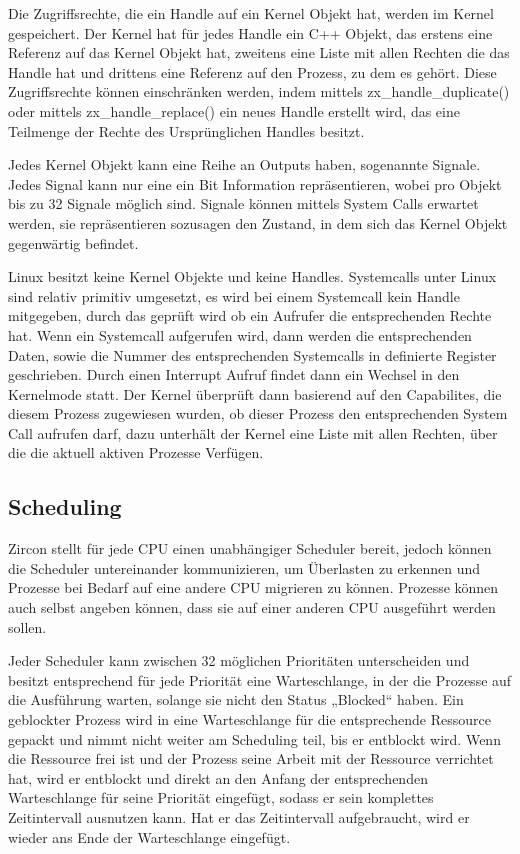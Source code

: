 \documentclass[a4paper]{scrartcl}
\begin{document}
Die Zugriffsrechte, die ein Handle auf ein Kernel Objekt hat, werden im Kernel gespeichert. Der Kernel hat für jedes Handle ein C++ Objekt, das erstens eine Referenz auf das Kernel Objekt hat, zweitens eine Liste mit allen Rechten die das Handle hat und drittens eine Referenz auf den Prozess, zu dem es gehört. Diese Zugriffsrechte können einschränken werden, indem mittels zx\_handle\_duplicate() \cite{Fuchsia.HandleDuplicate} oder mittels zx\_handle\_replace() \cite{Fuchsia.HandleReplace} ein neues Handle erstellt wird, das eine Teilmenge der Rechte des Ursprünglichen Handles besitzt.  \cite{Fuchsia.Zircon.Handles}

Jedes Kernel Objekt kann eine Reihe an Outputs haben, sogenannte Signale. Jedes Signal kann nur eine ein Bit Information repräsentieren, wobei pro Objekt bis zu 32 Signale möglich sind. Signale können mittels System Calls erwartet werden, sie repräsentieren sozusagen den Zustand, in dem sich das Kernel Objekt gegenwärtig befindet. \cite{Fuchsia.Zircon.Signals}

Linux besitzt keine Kernel Objekte und keine Handles. Systemcalls unter Linux sind relativ primitiv umgesetzt, es wird bei einem Systemcall kein Handle mitgegeben, durch das geprüft wird ob ein Aufrufer die entsprechenden Rechte hat. Wenn ein Systemcall aufgerufen wird, dann werden die entsprechenden Daten, sowie die Nummer des entsprechenden Systemcalls in definierte Register geschrieben. Durch einen Interrupt Aufruf findet dann ein Wechsel in den Kernelmode statt. Der Kernel überprüft dann basierend auf den Capabilites, die diesem Prozess zugewiesen wurden, ob dieser Prozess den entsprechenden System Call aufrufen darf, dazu unterhält der Kernel eine Liste mit allen Rechten, über die die aktuell aktiven Prozesse Verfügen. \cite{Android.Kernel.Capabilities}
\subsection{Scheduling}
Zircon stellt für jede CPU einen unabhängiger Scheduler bereit, jedoch können die Scheduler untereinander kommunizieren, um Überlasten zu erkennen und Prozesse bei Bedarf auf eine andere CPU migrieren zu können. Prozesse können auch selbst angeben können, dass sie auf einer anderen CPU ausgeführt werden sollen.

Jeder Scheduler kann zwischen 32 möglichen Prioritäten unterscheiden und besitzt entsprechend für jede Priorität eine Warteschlange, in der die Prozesse auf die Ausführung warten, solange sie nicht den Status „Blocked“ haben. Ein geblockter Prozess wird in eine Warteschlange für die entsprechende Ressource gepackt und nimmt nicht weiter am Scheduling teil, bis er entblockt wird. Wenn die Ressource frei ist und der Prozess seine Arbeit mit der Ressource verrichtet hat, wird er entblockt und direkt an den Anfang der entsprechenden Warteschlange für seine Priorität eingefügt, sodass er sein komplettes Zeitintervall ausnutzen kann. Hat er das Zeitintervall aufgebraucht, wird er wieder ans Ende der Warteschlange eingefügt. \cite{Fuchsia.Zircon.Scheduling}
\end{document}
